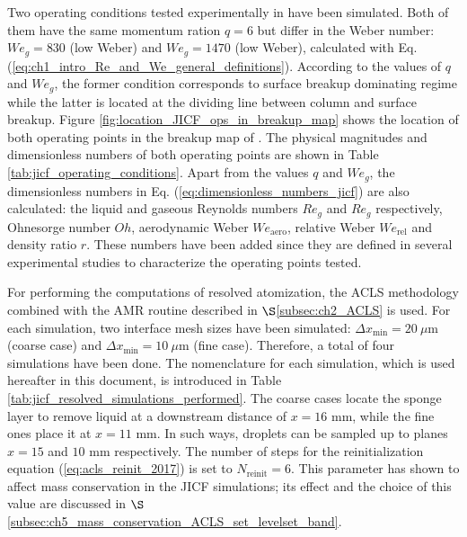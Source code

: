 Two operating conditions tested experimentally in  have been simulated. Both of them have the same momentum ration $q = 6$ but differ in the Weber number: $We_g = 830$ (low Weber) and $We_g = 1470$ (low Weber), calculated with Eq. (\ref{eq:ch1_intro_Re_and_We_general_definitions}). According to the values of $q$ and $We_g$, the former condition corresponds to surface breakup dominating regime while the latter is located at the dividing line between column and surface breakup. Figure \ref{fig:location_JICF_ops_in_breakup_map} shows the location of both operating points in the breakup map of \citeColor[wu_breakup_1997]. The physical magnitudes and dimensionless numbers of both operating points are shown in Table \ref{tab:jicf_operating_conditions}. Apart from the values $q$ and $We_g$, the dimensionless numbers in  Eq. (\ref{eq:dimensionless_numbers_jicf}) are also calculated: the liquid and gaseous Reynolds numbers $Re_g$ and $Re_g$ respectively, Ohnesorge number $Oh$, aerodynamic Weber $We_\mathrm{aero}$, relative Weber $We_\mathrm{rel}$ and density ratio $r$. These numbers have been added since they are defined in several experimental studies  to characterize the operating points tested. 

For performing the computations of resolved atomization, the ACLS methodology combined with the AMR routine described in $\S$\ref{subsec:ch2_ACLS} is used. For each simulation, two interface mesh sizes have been simulated: $\Delta x_\mathrm{min} = 20 ~\mu$m (coarse case) and $\Delta x_\mathrm{min} = 10 ~\mu$m (fine case). Therefore, a total of four simulations have been done. The nomenclature for each simulation, which is used hereafter in this document, is introduced in Table \ref{tab:jicf_resolved_simulations_performed}.  The coarse cases locate the sponge layer to remove liquid at a downstream distance of $x = 16$ mm, while the fine ones place it at $x = 11$ mm. In such ways, droplets can be sampled up to planes $x = 15$ and $10$ mm respectively. The number of steps for the reinitialization equation (\ref{eq:acls_reinit_2017}) is set to $N_\mathrm{reinit} = 6$. This parameter has shown to affect mass conservation in the JICF simulations; its effect and the choice of this value are discussed in $\S$\ref{subsec:ch5_mass_conservation_ACLS_set_levelset_band}.


